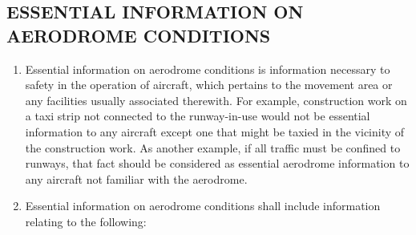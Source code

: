 \subsection[Essential information on aerodrome conditions]{ESSENTIAL INFORMATION ON AERODROME CONDITIONS}

\begin{enumempty}[labelindent=\parindent]
    \item {}
\end{enumempty}

\begin{enumerate}[label=\arabic{section}.\arabic{subsection}.\arabic*]
    \item \label{7.5.1} Essential information on aerodrome conditions is information necessary to safety in the operation of aircraft, which pertains to the movement area or any facilities usually associated therewith. For example, construction work on a taxi strip not connected to the runway-in-use would not be essential information to any aircraft except one that might be taxied in the vicinity of the construction work. As another example, if all traffic must be confined to runways, that fact should be considered as essential aerodrome information to any aircraft not familiar with the aerodrome.
    \item \label{7.5.2} Essential information on aerodrome conditions shall include information relating to the following:



\end{enumerate}
